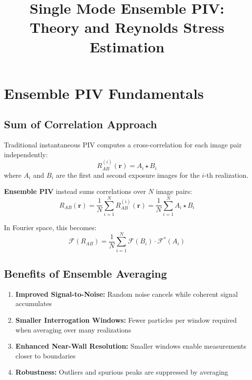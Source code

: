 \documentclass[11pt,a4paper]{article}
\title{Single Mode Ensemble PIV: Theory and Reynolds Stress Estimation}
\author{}
\date{}
\begin{document}
\maketitle

\section{Ensemble PIV Fundamentals}

\subsection{Sum of Correlation Approach}

Traditional instantaneous PIV computes a cross-correlation for each image pair independently:
\begin{equation}
    R_{AB}^{(i)}(\mathbf{r}) = A_i \star B_i
\end{equation}
where $A_i$ and $B_i$ are the first and second exposure images for the $i$-th realization.

\textbf{Ensemble PIV} instead sums correlations over $N$ image pairs:
\begin{equation}
    R_{AB}(\mathbf{r}) = \frac{1}{N} \sum_{i=1}^{N} R_{AB}^{(i)}(\mathbf{r}) = \frac{1}{N} \sum_{i=1}^{N} A_i \star B_i
\end{equation}

In Fourier space, this becomes:
\begin{equation}
    \mathcal{F}(R_{AB}) = \frac{1}{N} \sum_{i=1}^{N} \mathcal{F}(B_i) \cdot \mathcal{F}^*(A_i)
\end{equation}

\subsection{Benefits of Ensemble Averaging}

\begin{enumerate}
    \item \textbf{Improved Signal-to-Noise:} Random noise cancels while coherent signal accumulates
    \item \textbf{Smaller Interrogation Windows:} Fewer particles per window required when averaging over many realizations
    \item \textbf{Enhanced Near-Wall Resolution:} Smaller windows enable measurements closer to boundaries
    \item \textbf{Robustness:} Outliers and spurious peaks are suppressed by averaging
\end{enumerate}
\end{document}
